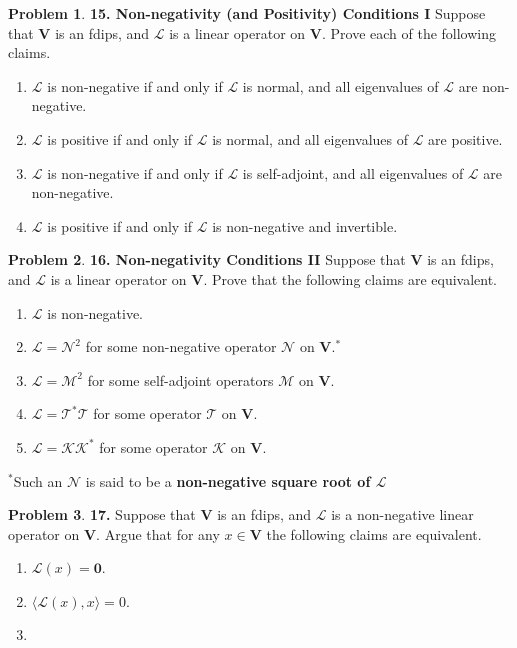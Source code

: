 \documentclass{article}
\theoremstyle{definition}
\newtheorem*{prob*}{Problem}
\newcommand{\V}{\mathbf{V}}
\newcommand{\lag}{\mathcal{L}}
\newcommand{\M}{\mathcal{M}}
\newcommand{\K}{\mathcal{K}}
\newcommand{\N}{\mathcal{N}}
\newcommand{\T}{\mathcal{T}}
\newcommand{\la}{\langle}
\newcommand{\ra}{\rangle}
\begin{document}
\begin{prob*}\textbf{15. Non-negativity (and Positivity) Conditions I}
	Suppose that $\V$ is an fdips, and $\lag$ is a linear operator on $\V$. Prove each of the following claims.
	\begin{enumerate}
		\item $\lag$ is non-negative if and only if $\lag$ is normal, and all eigenvalues of $\lag$ are non-negative. 
		
		\item $\lag$ is positive if and only if $\lag$ is normal, and all eigenvalues of $\lag$ are positive. 
		
		\item $\lag$ is non-negative if and only if $\lag$ is self-adjoint, and all eigenvalues of $\lag$ are non-negative.
		
		\item $\lag$ is positive if and only if $\lag$ is non-negative and invertible. 
	\end{enumerate}
	
\end{prob*}

\newpage





\begin{prob*}\textbf{16. Non-negativity Conditions II}
	Suppose that $\V$ is an fdips, and $\lag$ is a linear operator on $\V$. Prove that the following claims are equivalent.
	\begin{enumerate}
		\item $\lag$ is non-negative.
		\item $\lag = \N^2$ for some non-negative operator $\N$ on $\V$.$^*$
		\item $\lag = \M^2$ for some self-adjoint operators $\M$ on $\V$.
		\item $\lag = \T^*\T$ for some operator $\T$ on $\V$.
		\item $\lag = \K \K^*$ for some operator $\K$ on $\V$.
	\end{enumerate}	
	$^*$Such an $\N$ is said to be a \textbf{non-negative square root of $\lag$}
	
\end{prob*}



\newpage



\begin{prob*}\textbf{17.}
	Suppose that $\V$ is an fdips, and $\lag$ is a non-negative linear operator on $\V$. Argue that for any $x \in \V$ the following claims are equivalent.
	\begin{enumerate}
		\item $\lag(x) = \mathbf{0}$.
		\item $\la \lag(x),x \ra = 0$.
		\item 
	\end{enumerate}
	
\end{prob*}
\end{document}
